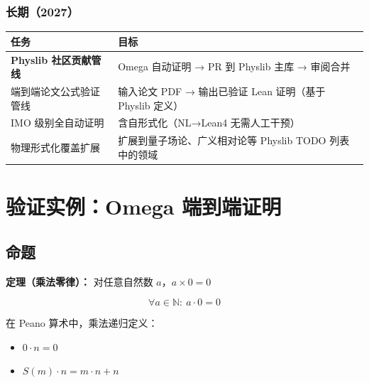 \documentclass[
  11pt,
  a4paper,
]{ctexrep}
\newcounter{none} %
\providecommand{\tightlist}{%
  \setlength{\itemsep}{0pt}\setlength{\parskip}{0pt}}
\begin{document}
\subsection{长期（2027）}\label{ux957fux671f2027}

{\def\LTcaptype{none} %
\begin{longtable}[]{@{}
  >{\raggedright\arraybackslash}p{}
  >{\raggedright\arraybackslash}p{}@{}}
\toprule\noalign{}
\begin{minipage}[b]{\linewidth}\raggedright
任务
\end{minipage} & \begin{minipage}[b]{\linewidth}\raggedright
目标
\end{minipage} \\
\midrule\noalign{}
\endhead
\bottomrule\noalign{}
\endlastfoot
\textbf{Physlib 社区贡献管线} & Omega 自动证明 → PR 到 Physlib 主库 →
审阅合并 \\
端到端论文公式验证管线 & 输入论文 PDF → 输出已验证 Lean 证明（基于
Physlib 定义） \\
IMO 级别全自动证明 & 含自形式化（NL→Lean4 无需人工干预） \\
物理形式化覆盖扩展 & 扩展到量子场论、广义相对论等 Physlib TODO
列表中的领域 \\
\end{longtable}
}

\newpage

\cleardoublepage
{}
{}
\appendix

\chapter{验证实例：Omega
端到端证明}\label{ux9a8cux8bc1ux5b9eux4f8bomega-ux7aefux5230ux7aefux8bc1ux660e}

\section{命题}\label{sec-proposition}

\textbf{定理（乘法零律）：} 对任意自然数 \(a\)，\(a \times 0 = 0\)

\[
\forall a \in \mathbb{N}:\ a \cdot 0 = 0
\]

在 Peano 算术中，乘法递归定义：

\begin{itemize}
\tightlist
\item
  \(0 \cdot n = 0\)
\item
  \(S(m) \cdot n = m \cdot n + n\)
\end{itemize}
\end{document}
